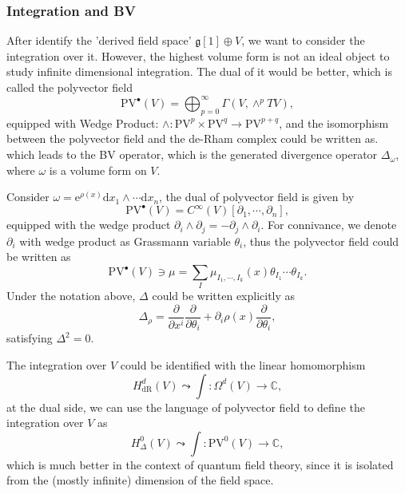 \documentclass[10pt]{article}
\begin{document}
\subsubsection{Integration and BV}

After identify the 'derived field space' $ \mathfrak{g}[1] \oplus V$, we want to consider the integration over it.
However, the highest volume form is not an ideal object to study infinite dimensional integration. The dual of it would be better, which is called the polyvector field
\begin{equation*}
  \mathrm{PV}^{\bullet}(V) = \bigoplus_{p=0}^{\infty}\Gamma\left( V, \wedge^{p} TV \right),
\end{equation*}
equipped with Wedge Product: $\wedge: \mathrm{PV}^{p} \times \mathrm{PV}^{q} \rightarrow \mathrm{PV}^{p+q}$, and the isomorphism between the polyvector field and the de-Rham complex could be written as.
which leads to the BV operator, which is the generated divergence operator $\Delta_{\omega}$, where $ \omega$ is a volume form on $ V$.
\begin{example}
  Consider $ \omega = \mathrm{e}^{\rho(x)} \mathrm{d} x_1 \wedge \cdots \mathrm{d} x_n$, the dual of polyvector field is given by
  \begin{equation*}
    \mathrm{PV}^{\bullet}(V) = C^{\infty }(V)[\partial_{1}, \cdots ,\partial_{n}],
  \end{equation*}
  equipped with the wedge product $ \partial_{i} \wedge \partial_{j} = - \partial_{j} \wedge \partial_{i}$. For connivance, we denote $\partial_{i}$ with wedge product as Grassmann variable $ \theta_{i}$, thus the polyvector field could be written as
  \begin{equation*}
    \mathrm{PV}^{\bullet}(V) \ni \mu = \sum_{I} \mu_{I_1, \cdots ,I_k}(x) \theta_{I_1} \cdots \theta_{I_k}.
  \end{equation*}
  Under the notation above, $ \Delta$ could be written explicitly as
  \begin{equation*}
    \Delta_{\rho} = \frac{\partial }{\partial x^{i}} \frac{\partial }{\partial \theta_{i}} + \partial_{i} \rho(x) \frac{\partial }{\partial \theta_{i}},
  \end{equation*}
  satisfying $ \Delta^{2} = 0$.
\end{example}

The integration over $ V$ could be identified with the linear homomorphism
\begin{equation*}
  H^{d}_{\mathrm{dR}}(V) \leadsto \int : \Omega^{d}(V) \rightarrow \mathbb{C},
\end{equation*}
at the dual side, we can use the language of polyvector field to define the integration over $ V$ as
\begin{equation*}
  H^{0}_{\Delta}(V) \leadsto \int: \mathrm{PV}^{0}(V) \rightarrow \mathbb{C},
\end{equation*}
which is much better in the context of quantum field theory, since it is isolated from the (mostly infinite) dimension of the field space.
\end{document}
